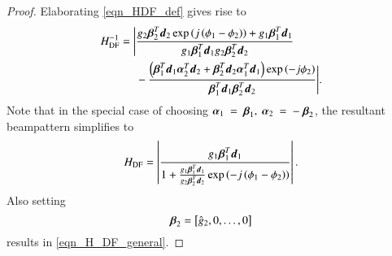 \begin{proof}
    Elaborating \eqref{eqn_HDF_def} gives rise to
    \fi
    \begin{equation*}
        \centering
        \ifdefined\useOmega
            \resizebox{1\linewidth}{!}{
        \fi
                \begin{split}
                    H_{\text{DF}}^{-1}
                    =
                    \Bigg{|}
                    &\frac
                    {
                    \gI{2}\vBetaTI{2}\vdI{2}\exp{\rBrace{j\rBrace{\phiI{1}-\phiI{2}}}}+\gI{1}\vBetaTI{1}\vdI{1}
                    }{
                    \gI{1}\vBetaTI{1}\vdI{1}\gI{2}\vBetaTI{2}\vdI{2}
                    }
                    \\&-
                    \frac
                    {
                    \rBrace{\vBetaTI{1}\vdI{1}\vAlphaTI{2}\vdI{2}+\vBetaTI{2}\vdI{2}\vAlphaT_{1}\vdI{1}}\exp{\rBrace{-j\phiI{2}}}
                    }{
                    \vBetaTI{1}\vdI{1}\vBetaTI{2}\vdI{2}
                    }
                    \Bigg{|}.
                \end{split}
        \ifdefined\useOmega
            }
        \fi
    \end{equation*}
    \ifdefined\useOmega
    \fi
    Note that in the special case of choosing $\vAlphaI{1}~=~\vBetaI{1},\ \vAlphaI{2}~=~-~\vBetaI{2}$, the resultant beampattern simplifies to
    \begin{equation*}
        H_{\text{DF}} = \left|{\frac{g_{1}\boldsymbol{\beta}^{T}_{1}\boldsymbol{d}_{1}}{1+\frac{g_{1}\boldsymbol{\beta}^{T}_{1}\boldsymbol{d}_{1}}{g_{2}\boldsymbol{\beta}^{T}_{2}\boldsymbol{d}_{2}}\exp{\left({-j\left({\phi_{1}-\phi_{2}}\right)}\right)}}}\right|.
    \end{equation*}
    Also setting
    $$\boldsymbol{\beta}_{2}=\left[{\hat{g}_{2},0,\hdots,0}\right]$$
    results in \eqref{eqn_H_DF_general}.
\end{proof}